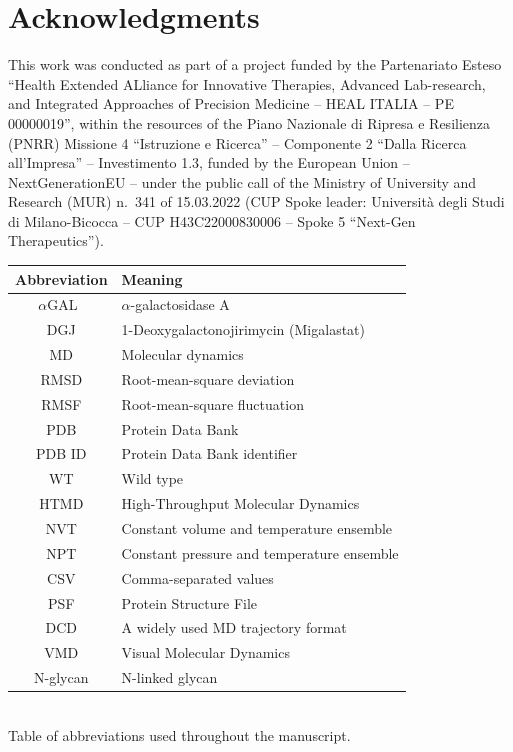 \documentclass{article}
\newcommand{\agal}{$\alpha$GAL}
\begin{document}
\section*{Acknowledgments}

This work was conducted as part of a project funded by the Partenariato Esteso ``Health Extended ALliance for Innovative Therapies, Advanced Lab-research, and Integrated Approaches of Precision Medicine -- HEAL ITALIA -- PE 00000019'', within the resources of the Piano Nazionale di Ripresa e Resilienza (PNRR) Missione 4 ``Istruzione e Ricerca'' -- Componente 2 ``Dalla Ricerca all'Impresa'' -- Investimento 1.3, funded by the European Union -- NextGenerationEU -- under the public call of the Ministry of University and Research (MUR) n.~341 of 15.03.2022 (CUP Spoke leader: Università degli Studi di Milano-Bicocca -- CUP H43C22000830006 -- Spoke 5 ``Next-Gen Therapeutics'').


\begin{table}[h!]
\centering
\begin{tabular}{cl}
\toprule
\textbf{Abbreviation} & \textbf{Meaning} \\
\midrule
\agal\ & $\alpha$-galactosidase A \\
DGJ & 1-Deoxygalactonojirimycin (Migalastat) \\
MD & Molecular dynamics \\
RMSD & Root-mean-square deviation \\
RMSF & Root-mean-square fluctuation \\
PDB & Protein Data Bank \\
PDB ID & Protein Data Bank identifier \\
WT & Wild type \\
HTMD & High-Throughput Molecular Dynamics \\
NVT & Constant volume and temperature ensemble \\
NPT & Constant pressure and temperature ensemble \\
CSV & Comma-separated values \\
PSF & Protein Structure File \\
DCD & A widely used MD trajectory format \\
VMD & Visual Molecular Dynamics \\
N-glycan & N-linked glycan \\
\bottomrule
\end{tabular}
\\[3mm]
Table of abbreviations used throughout the manuscript.
\end{table}

\printbibliography
\end{document}

